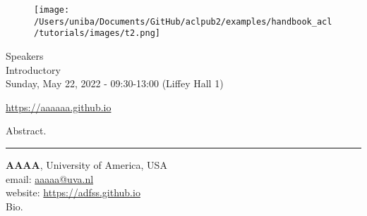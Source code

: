 \begin{center}
    \vspace{-0.5cm}
    \begin{figure}[h!]
      \texttt{[image: /Users/uniba/Documents/GitHub/aclpub2/examples/handbook\_acl/tutorials/images/t2.png]}
    \end{figure}
    \normalsize{Speakers}\\
    \large{Introductory}\\
    \large{Sunday, May 22, 2022 - 09:30-13:00 (Liffey Hall 1)}\\
    \par\bigskip
    \normalsize{\url{https://aaaaaa.github.io}}

\end{center}

Abstract.

\begin{center}
    \noindent\rule{200px}{1pt}
\end{center}

\noindent
\textbf{AAAA}, University of America, USA \\
email: \url{aaaaa@uva.nl} \\
website: \url{https://adfss.github.io} \\
Bio.\\